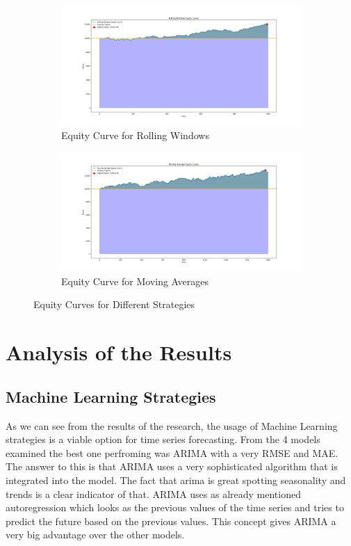 \documentclass{imc-inf}
\begin{document}
\begin{figure}[h!]
		\begin{subfigure}{0.45\textwidth}
			\centering
			\includegraphics[width=\textwidth]{equity_curve_rolling_windows.png}
			\caption{Equity Curve for Rolling Windows}
			\label{fig:equity_curve_rolling_windows}
		\end{subfigure}
		\hfill
		\begin{subfigure}{0.45\textwidth}
			\centering
			\includegraphics[width=\textwidth]{equity_curve_moving_averages.png}
			\caption{Equity Curve for Moving Averages}
			\label{fig:equity_curve_moving_averages}
		\end{subfigure}
		
		\caption{Equity Curves for Different Strategies}
		\label{fig:combined_equity_curves}
	\end{figure}
	
	\section{Analysis of the Results}
		\subsection{Machine Learning Strategies}
		As we can see from the results of the research, the usage of Machine Learning strategies is a viable option for time series forecasting. From the 4 models examined the best one perfroming was ARIMA with a very 
		RMSE and MAE. The answer to this is that ARIMA uses a very sophisticated algorithm that is integrated into the model. The fact that arima is great spotting seasonality and trends is a clear indicator of that.
		ARIMA uses as already mentioned autoregression which looks as the previous values of the time series and tries to predict the future based on the previous values. This concept gives ARIMA a very big advantage over the other models.
\end{document}
